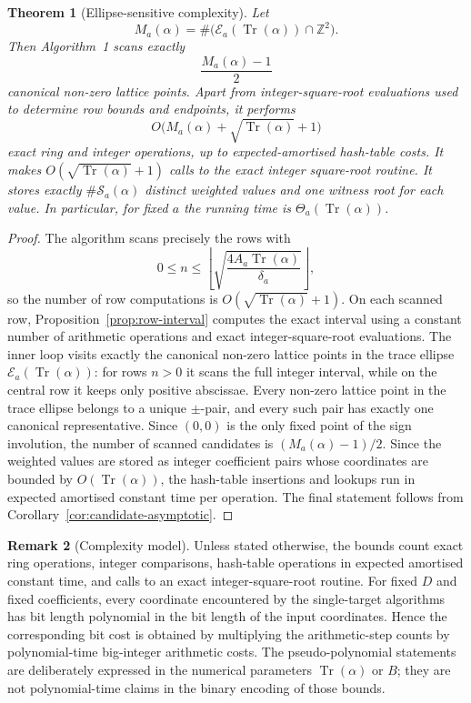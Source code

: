 \documentclass[manuscript]{acmart}
\theoremstyle{plain}
\newtheorem{theorem}{Theorem}[section]
\theoremstyle{definition}
\theoremstyle{nonitalicremark}
\newtheorem{remark}[theorem]{Remark}
\newcommand{\Z}{\mathbb{Z}}
\newcommand{\Tr}{\operatorname{Tr}}
\newcommand{\cE}{\mathcal{E}}
\newcommand{\cS}{\mathcal{S}}
\begin{document}
\begin{theorem}[Ellipse-sensitive complexity]\label{thm:candidate-sensitive}
Let
\[
M_a(\alpha)=\#\bigl(\cE_a(\Tr(\alpha))\cap\Z^2\bigr).
\]
Then Algorithm~1 scans exactly
\[
\frac{M_a(\alpha)-1}{2}
\]
canonical non-zero lattice points. Apart from integer-square-root evaluations used to determine row
bounds and endpoints, it performs
\[
O\bigl(M_a(\alpha)+\sqrt{\Tr(\alpha)}+1\bigr)
\]
exact ring and integer operations, up to expected-amortised hash-table costs. It makes
$O(\sqrt{\Tr(\alpha)}+1)$ calls to the exact integer square-root routine. It stores exactly $\#\cS_a(\alpha)$
distinct weighted values and one witness root for each value. In particular, for fixed $a$ the
running time is $\Theta_a(\Tr(\alpha))$.
\end{theorem}

\begin{proof}
The algorithm scans precisely the rows with
\[
0\le n\le \left\lfloor \sqrt{\frac{4A_a\Tr(\alpha)}{\delta_a}}\right\rfloor,
\]
so the number of row computations is $O(\sqrt{\Tr(\alpha)}+1)$. On each scanned row,
Proposition~\ref{prop:row-interval} computes the exact interval using a constant number of arithmetic operations and exact integer-square-root evaluations. The
inner loop visits exactly the canonical non-zero lattice points in the trace ellipse
$\cE_a(\Tr(\alpha))$: for rows $n>0$ it scans the full integer interval, while on the central row it
keeps only positive abscissae. Every non-zero lattice point in the trace ellipse belongs to a unique
$\pm$-pair, and every such pair has exactly one canonical representative. Since $(0,0)$ is the only
fixed point of the sign involution, the number of scanned candidates is $(M_a(\alpha)-1)/2$.
Since the weighted values are stored as integer coefficient pairs whose coordinates are bounded by
$O(\Tr(\alpha))$, the hash-table insertions and lookups run in expected amortised constant time per
operation. The final statement follows from Corollary~\ref{cor:candidate-asymptotic}.
\end{proof}

\begin{remark}[Complexity model]
Unless stated otherwise, the bounds count exact ring operations, integer comparisons, hash-table
operations in expected amortised constant time, and calls to an exact integer-square-root routine.
For fixed $D$ and fixed coefficients, every coordinate encountered by the single-target algorithms
has bit length polynomial in the bit length of the input coordinates. Hence the corresponding bit
cost is obtained by multiplying the arithmetic-step counts by polynomial-time big-integer arithmetic
costs. The pseudo-polynomial statements are deliberately expressed in the numerical parameters
$\Tr(\alpha)$ or $B$; they are not polynomial-time claims in the binary encoding of those bounds.
\end{remark}
\end{document}
